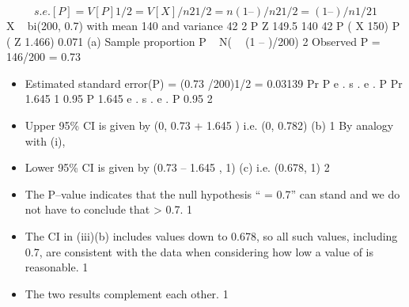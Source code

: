 \documentclass[a4paper,12pt]{article}
\begin{document}
\[s.e.[P] = {V[P]}1/2 = {V[X]/n 2}1/2 = {n (1 – )/n 2 }1/2 = { (1 – )/n}1/2 1\]
X ~ bi(200, 0.7) with mean 140 and variance 42 2
P Z
149.5 140
42
P ( X 150)
P ( Z
1.466) 0.071
(a) Sample proportion P ~ N(  (1 – )/200)
2
Observed P = 146/200 = 0.73
\begin{itemize}
\item Estimated standard error(P) = (0.73 /200)1/2 = 0.03139
Pr
P
e . s . e . P
Pr
1.645
1
0.95
P 1.645 e . s . e . P
0.95
2
\item Upper 95\% CI is given by (0, 0.73 + 1.645 )
i.e. (0, 0.782)
(b)
1
By analogy with (i),
\item Lower 95\% CI is given by (0.73 – 1.645 , 1)
(c)
i.e. (0.678, 1)  2
\item The P–value indicates that the null hypothesis “ = 0.7” can stand and we do not have to conclude that > 0.7. 1
\item The CI in (iii)(b) includes values down to 0.678, so all such values, including 0.7, are consistent with the data when considering how low a value of is reasonable. 1
\item The two results complement each other. 1

\end{itemize}
\end{document}
